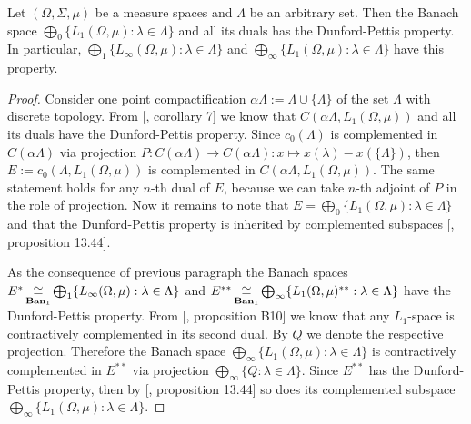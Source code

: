 \begin{proposition}\label{C0SumOfL1SpHaveDPP} Let $(\Omega, \Sigma, \mu)$ be a measure spaces and $\Lambda$ be an arbitrary set. Then the Banach space $\bigoplus_0\{L_1(\Omega,\mu):\lambda\in\Lambda\}$ and all its duals has the Dunford-Pettis property.
In particular, $\bigoplus_1\{L_\infty(\Omega,\mu):\lambda\in\Lambda\}$ and $\bigoplus_\infty\{L_1(\Omega,\mu):\lambda\in\Lambda\}$ have this property.
\end{proposition}
\begin{proof} Consider one point compactification $\alpha\Lambda:=\Lambda\cup\{\Lambda\}$ of the set $\Lambda$ with discrete topology. From [\cite{BourgOnTheDPP}, corollary 7] we know that $C(\alpha\Lambda, L_1(\Omega, \mu))$ and all its duals have the Dunford-Pettis property. Since $c_0(\Lambda)$ is complemented in $C(\alpha\Lambda)$ via projection $P:C(\alpha\Lambda)\to C(\alpha\Lambda):x\mapsto x(\lambda)-x(\{\Lambda\})$, then $E:=c_0(\Lambda, L_1(\Omega,\mu))$ is complemented in $C(\alpha\Lambda, L_1(\Omega, \mu))$. The same statement holds for any $n$-th dual of $E$, because we can take $n$-th adjoint of $P$ in the role of projection. Now it remains to note that $E=\bigoplus_0\{L_1(\Omega,\mu):\lambda\in\Lambda\}$ and that the Dunford-Pettis property is inherited by complemented subspaces [\cite{FabHabBanSpTh}, proposition 13.44]. 

As the consequence of previous paragraph the Banach spaces $E^*\mathop{\mathbin{\cong}}\limits_{\mathbf{Ban}_1}\bigoplus_1\{L_
\infty(\Omega,\mu):\lambda\in\Lambda\}$ and $E^{**}\mathop{\mathbin{\cong}}\limits_{\mathbf{Ban}_1}\bigoplus_\infty\{L_1(\Omega,\mu)^{**}:\lambda\in\Lambda\}$ have the Dunford-Pettis property. From [\cite{DefFloTensNorOpId}, proposition B10] we know that any $L_1$-space is contractively complemented in its second dual. By $Q$ we denote the respective projection. Therefore the Banach space $\bigoplus_\infty\{L_1(\Omega,\mu):\lambda\in\Lambda\}$ is contractively complemented in $E^{**}$ via projection $\bigoplus_\infty \{Q:\lambda\in\Lambda\}$. Since $E^{**}$ has the Dunford-Pettis property, then by [\cite{FabHabBanSpTh}, proposition 13.44] so does its complemented subspace $\bigoplus_\infty\{L_1(\Omega,\mu):\lambda\in\Lambda\}$.
\end{proof}

